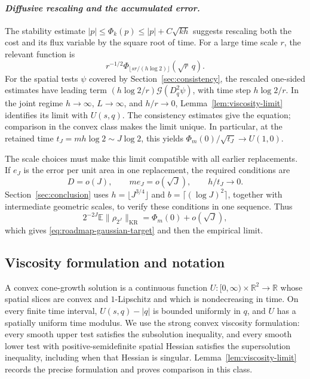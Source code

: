 \documentclass{aomart}
\theoremstyle{definition}
\newcommand{\1}{\mathbf 1}
\newcommand{\KR}{\mathrm{KR}}
\begin{document}
\smallskip
\paragraph{\textit{Diffusive rescaling and the accumulated error.}}
The stability estimate $|p|\leq\Phi_k(p)\leq|p|+C\sqrt{kh}$ suggests
rescaling both the cost and its flux variable by the square root of time.
For a large time scale $r$, the relevant function is
\[
r^{-1/2}\Phi_{\lfloor sr/(h\log2)\rfloor}(\sqrt r\,q).
\]
For the spatial tests $\psi$ covered by Section~\ref{sec:consistency},
the rescaled one-sided estimates have leading term
$(h\log2/r)\mathcal G(D_q^2\psi)$, with time step $h\log2/r$.
In the joint regime $h\to\infty$, $L\to\infty$, and $h/r\to0$,
Lemma~\ref{lem:viscosity-limit} identifies its limit with $U(s,q)$.
The consistency estimates give the equation; comparison in the convex
class makes the limit unique.  In particular, at the retained time
$t_J=mh\log2\sim J\log2$, this yields
$\Phi_m(0)/\sqrt{t_J}\to U(1,0)$.

The scale choices must make this limit compatible with all earlier
replacements.  If $e_J$ is the error per unit area in one replacement,
the required conditions are
\[
D=o(J),\qquad m e_J=o(\sqrt J),\qquad h/t_J\longrightarrow0.
\]
Section~\ref{sec:conclusion} uses $h=\lfloor J^{3/4}\rfloor$ and
$b=\lceil(\log J)^2\rceil$, together with intermediate geometric scales,
to verify these conditions in one sequence.  Thus
\[
2^{-2J}\mathbb E\|\rho_{2^J}\|_{\KR}
=\Phi_m(0)+o(\sqrt J),
\]
which gives \eqref{eq:roadmap-gaussian-target} and then the empirical
limit.

\subsection{Viscosity formulation and notation}\label{subsec:solution-class}

A convex cone-growth solution is a continuous function
\(U:[0,\infty)\times\mathbb R^2\to\mathbb R\) whose spatial slices are convex
and \(1\)-Lipschitz and which is nondecreasing in time.  On every finite time
interval, \(U(s,q)-|q|\) is bounded uniformly in \(q\), and \(U\) has a
spatially uniform time modulus.  We use the strong convex viscosity
formulation: every smooth upper test satisfies the subsolution inequality,
and every smooth lower test with positive-semidefinite spatial Hessian
satisfies the supersolution inequality, including when that Hessian is
singular.  Lemma~\ref{lem:viscosity-limit} records the precise formulation and
proves comparison in this class.
\end{document}

